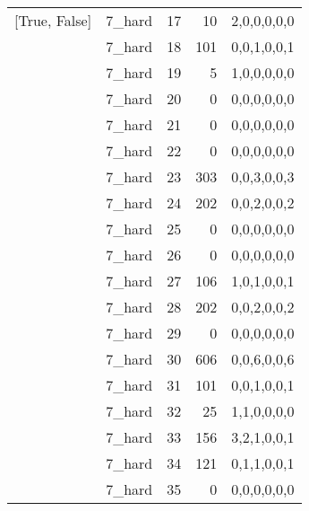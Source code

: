 \begin{tabular}{llrrl}
 [True, False]   & 7\_hard              &            17 &                    10 & 2,0,0,0,0,0   \\
 [True, False]   & 7\_hard              &            18 &                   101 & 0,0,1,0,0,1   \\
 [True, False]   & 7\_hard              &            19 &                     5 & 1,0,0,0,0,0   \\
 [True, False]   & 7\_hard              &            20 &                     0 & 0,0,0,0,0,0   \\
 [True, False]   & 7\_hard              &            21 &                     0 & 0,0,0,0,0,0   \\
 [True, False]   & 7\_hard              &            22 &                     0 & 0,0,0,0,0,0   \\
 [True, False]   & 7\_hard              &            23 &                   303 & 0,0,3,0,0,3   \\
 [True, False]   & 7\_hard              &            24 &                   202 & 0,0,2,0,0,2   \\
 [True, False]   & 7\_hard              &            25 &                     0 & 0,0,0,0,0,0   \\
 [True, False]   & 7\_hard              &            26 &                     0 & 0,0,0,0,0,0   \\
 [True, False]   & 7\_hard              &            27 &                   106 & 1,0,1,0,0,1   \\
 [True, False]   & 7\_hard              &            28 &                   202 & 0,0,2,0,0,2   \\
 [True, False]   & 7\_hard              &            29 &                     0 & 0,0,0,0,0,0   \\
 [True, False]   & 7\_hard              &            30 &                   606 & 0,0,6,0,0,6   \\
 [True, False]   & 7\_hard              &            31 &                   101 & 0,0,1,0,0,1   \\
 [True, False]   & 7\_hard              &            32 &                    25 & 1,1,0,0,0,0   \\
 [True, False]   & 7\_hard              &            33 &                   156 & 3,2,1,0,0,1   \\
 [True, False]   & 7\_hard              &            34 &                   121 & 0,1,1,0,0,1   \\
 [True, False]   & 7\_hard              &            35 &                     0 & 0,0,0,0,0,0   \\

\end{tabular}
